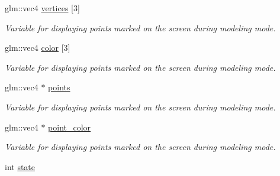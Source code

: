 {\bf }\par
\begin{DoxyCompactItemize}
\item 
glm\+::vec4 \hyperlink{classcft_1_1Crafter_afcc8528696d7bf63d8e5a4a9f05dce55}{vertices} \mbox{[}3\mbox{]}\hypertarget{classcft_1_1Crafter_afcc8528696d7bf63d8e5a4a9f05dce55}{}\label{classcft_1_1Crafter_afcc8528696d7bf63d8e5a4a9f05dce55}

\begin{DoxyCompactList}\small\item\em Variable for displaying points marked on the screen during modeling mode. \end{DoxyCompactList}\item 
glm\+::vec4 \hyperlink{classcft_1_1Crafter_ac05469c2f55a2988e145225a2d982292}{color} \mbox{[}3\mbox{]}\hypertarget{classcft_1_1Crafter_ac05469c2f55a2988e145225a2d982292}{}\label{classcft_1_1Crafter_ac05469c2f55a2988e145225a2d982292}

\begin{DoxyCompactList}\small\item\em Variable for displaying points marked on the screen during modeling mode. \end{DoxyCompactList}\item 
glm\+::vec4 $\ast$ \hyperlink{classcft_1_1Crafter_a4c305e74e5e73b9a29a54d4f3d2a27ee}{points}\hypertarget{classcft_1_1Crafter_a4c305e74e5e73b9a29a54d4f3d2a27ee}{}\label{classcft_1_1Crafter_a4c305e74e5e73b9a29a54d4f3d2a27ee}

\begin{DoxyCompactList}\small\item\em Variable for displaying points marked on the screen during modeling mode. \end{DoxyCompactList}\item 
glm\+::vec4 $\ast$ \hyperlink{classcft_1_1Crafter_a57ad393984170475d18f64af191ba414}{point\+\_\+color}\hypertarget{classcft_1_1Crafter_a57ad393984170475d18f64af191ba414}{}\label{classcft_1_1Crafter_a57ad393984170475d18f64af191ba414}

\begin{DoxyCompactList}\small\item\em Variable for displaying points marked on the screen during modeling mode. \end{DoxyCompactList}\item 
int \hyperlink{classcft_1_1Crafter_af938d739229975ec35d64ee76e683bc4}{state}\hypertarget{classcft_1_1Crafter_af938d739229975ec35d64ee76e683bc4}{}\label{classcft_1_1Crafter_af938d739229975ec35d64ee76e683bc4}


\end{DoxyCompactItemize}
